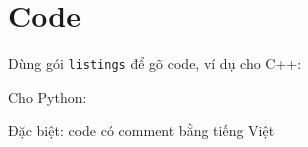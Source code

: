 \section{Code}
Dùng gói \texttt{listings} để gõ code, ví dụ cho C++:


Cho Python:


Đặc biệt: code có comment bằng tiếng Việt
\vietnameselst
